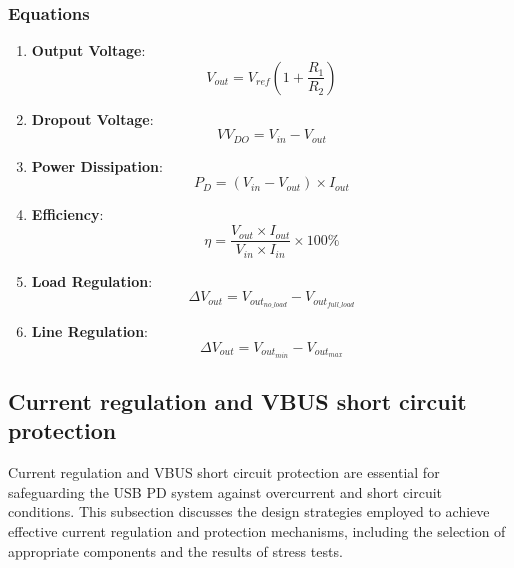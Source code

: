 \subsubsection{Equations}

\begin{enumerate}
    \item \textbf{Output Voltage}:
    \begin{equation}
\label{c3:eq9}
    V_{out} = V_{ref} \left(1 + \frac{R_1}{R_2}\right)
\end{equation}
  
    \item \textbf{Dropout Voltage}:
    \begin{equation}
\label{c3:eq10}
    VV_{DO} = V_{in} - V_{out}
\end{equation}
    
    \item \textbf{Power Dissipation}:
    \begin{equation}
\label{c3:eq11}
    P_D = (V_{in} - V_{out}) \times I_{out}
\end{equation}
    
    \item \textbf{Efficiency}:
    \begin{equation}
\label{c3:eq12}
    \eta = \frac{V_{out} \times I_{out}}{V_{in} \times I_{in}} \times 100\%
\end{equation}
    
    \item \textbf{Load Regulation}:
    \begin{equation}
\label{c3:eq13}
    \Delta V_{out} = V_{out_{no\_load}} - V_{out_{full\_load}}
\end{equation}
    
    \item \textbf{Line Regulation}:
    \begin{equation}
\label{c3:eq14}
    \Delta V_{out} = V_{out_{min}} - V_{out_{max}}
\end{equation}
    
\end{enumerate}
\subsection{Current regulation and VBUS short circuit protection}

Current regulation and VBUS short circuit protection are essential for safeguarding the USB PD system against overcurrent and short circuit conditions\cite{ti_lm1084}. This subsection discusses the design strategies employed to achieve effective current regulation and protection mechanisms, including the selection of appropriate components and the results of stress tests.

